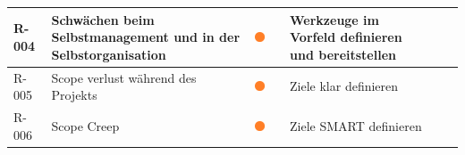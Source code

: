 \begin{table}[H]
{\begin{tabular}{lllllll}
R-004                                                                       & Schwächen beim Selbstmanagement und in der Selbstorganisation                                      & {\includegraphics[width=0.05\linewidth]{source/status_report/main/risk_warning}}                     &                         & Werkzeuge im Vorfeld definieren und bereitstellen                                                                                                            &                                                                                                                                                              &                                                                                                                               \\ \hline
R-005                                                                       & Scope verlust während des Projekts                                                                 & {\includegraphics[width=0.05\linewidth]{source/status_report/main/risk_warning}}                     &                         & Ziele klar definieren                                                                                                                                        &                                                                                                                                                              &                                                                                                                               \\ \hline
R-006                                                                       & Scope Creep                                                                                        & {\includegraphics[width=0.05\linewidth]{source/status_report/main/risk_warning}}                     &                         & Ziele SMART definieren                                                                                                                                       &                                                                                                                                                              &                                                                                                                               \\ \hline

\end{tabular}}
\end{table}

